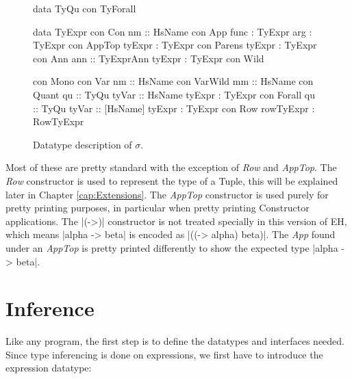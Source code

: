 \begin{figure}[H]
\begin{minipage}[t]{0.4\linewidth}
\begin{code}
data TyQu
  con TyForall
    
data TyExpr
  con Con
    nm         :: HsName
  con App      
    func       :  TyExpr
    arg        :  TyExpr
  con AppTop   
    tyExpr     :  TyExpr
  con Parens   
    tyExpr     :  TyExpr
  con Ann      
    ann        :: TyExprAnn
    tyExpr     :  TyExpr
  con Wild
\end{code}
\end{minipage}
\begin{minipage}[t]{0.6\linewidth}
\begin{code}
  con Mono
  con Var
    nm         :: HsName
  con VarWild  
    mm         :: HsName
  con Quant    
    qu         :: TyQu
    tyVar      :: HsName
    tyExpr     :  TyExpr
  con Forall   
    qu         :: TyQu
    tyVar      :: [HsName]
    tyExpr     :  TyExpr    
  con Row      
    rowTyExpr  :  RowTyExpr
\end{code}
\end{minipage}
\caption{Datatype description of $\sigma$.}
\label{abs:fig:tyexpr}
\end{figure}

Most of these are pretty standard with the exception of \emph{Row} and \emph{AppTop}. The \emph{Row} constructor is used to represent the type of a Tuple, this will be explained later in Chapter \ref{cap:Extensions}. 
The \emph{AppTop} constructor is used purely for pretty printing purposes, in particular when pretty printing Constructor applications. The |(->)| constructor is not treated specially in this version of EH, which means |alpha -> beta| is encoded as |((-> alpha) beta)|. The \emph{App} found under an \emph{AppTop} is pretty printed differently to show the expected type |alpha -> beta|.

\section{Inference}
Like any \rcore program, the first step is to define the datatypes and interfaces needed. Since type inferencing is done on expressions, we first have to introduce the expression datatype:

